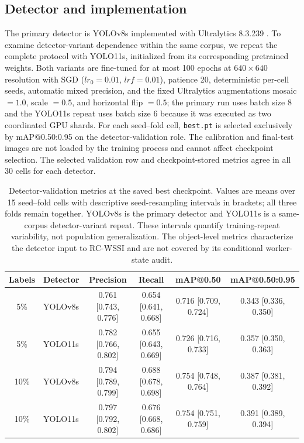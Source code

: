 \documentclass[iicol,pdflatex,sn-mathphys-num]{sn-jnl}
\begin{document}
\subsection{Detector and implementation}

The primary detector is YOLOv8s implemented with Ultralytics 8.3.239 \cite{ultralytics2025}. To examine detector-variant dependence within the same corpus, we repeat the complete protocol with YOLO11s, initialized from its corresponding pretrained weights. Both variants are fine-tuned for at most 100 epochs at $640\times640$ resolution with SGD ($lr_0=0.01$, $lrf=0.01$), patience 20, deterministic per-cell seeds, automatic mixed precision, and the fixed Ultralytics augmentations mosaic $=1.0$, scale $=0.5$, and horizontal flip $=0.5$; the primary run uses batch size 8 and the YOLO11s repeat uses batch size 6 because it was executed as two coordinated GPU shards. For each seed--fold cell, \texttt{best.pt} is selected exclusively by mAP@0.50:0.95 on the detector-validation role. The calibration and final-test images are not loaded by the training process and cannot affect checkpoint selection. The selected validation row and checkpoint-stored metrics agree in all 30 cells for each detector.

\begin{table}[t]
\caption{Detector-validation metrics at the saved best checkpoint. Values are means over 15 seed--fold cells with descriptive seed-resampling intervals in brackets; all three folds remain together. YOLOv8s is the primary detector and YOLO11s is a same-corpus detector-variant repeat. These intervals quantify training-repeat variability, not population generalization. The object-level metrics characterize the detector input to RC-WSSI and are not covered by its conditional worker-state audit.}
\label{tab:detector}
\centering
\scriptsize
\setlength{\tabcolsep}{5pt}
\begin{tabular}{@{}c l c c c c@{}}
\toprule
Labels & Detector & Precision & Recall & mAP@0.50 & mAP@0.50:0.95 \\
\midrule
5\%  & YOLOv8s & 0.761 [0.743, 0.776] & 0.654 [0.641, 0.668] & 0.716 [0.709, 0.724] & 0.343 [0.336, 0.350] \\
5\%  & YOLO11s & 0.782 [0.766, 0.802] & 0.655 [0.643, 0.669] & 0.726 [0.716, 0.733] & 0.357 [0.350, 0.363] \\
10\% & YOLOv8s & 0.794 [0.789, 0.799] & 0.688 [0.678, 0.698] & 0.754 [0.748, 0.764] & 0.387 [0.381, 0.392] \\
10\% & YOLO11s & 0.797 [0.792, 0.802] & 0.676 [0.668, 0.686] & 0.754 [0.751, 0.759] & 0.391 [0.389, 0.394] \\
\bottomrule
\end{tabular}
\end{table}
\end{document}
